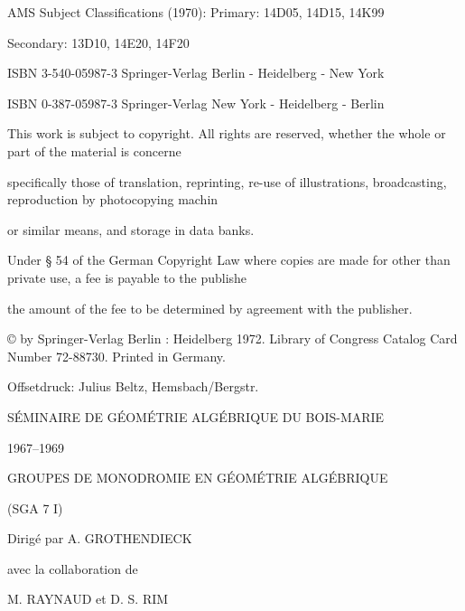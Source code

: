 \noindent
AMS Subject Classifications (1970): Primary: 14D05, 14D15, 14K99\par
\hspace*{8em}Secondary: 13D10, 14E20, 14F20\par

\medskip
\noindent
ISBN 3-540-05987-3 Springer-Verlag Berlin - Heidelberg - New York\par
ISBN 0-387-05987-3 Springer-Verlag New York - Heidelberg - Berlin\par

\medskip
\noindent
This work is subject to copyright. All rights are reserved, whether the whole or part of the material is concerne\par
specifically those of translation, reprinting, re-use of illustrations, broadcasting, reproduction by photocopying machin\par
or similar means, and storage in data banks.\par
Under § 54 of the German Copyright Law where copies are made for other than private use, a fee is payable to the publishe\par
the amount of the fee to be determined by agreement with the publisher.\par

\medskip
\noindent
© by Springer-Verlag Berlin : Heidelberg 1972. Library of Congress Catalog Card Number 72-88730. Printed in Germany.\par

\medskip
\noindent
Offsetdruck: Julius Beltz, Hemsbach/Bergstr.\par
\clearpage

\begin{center}
SÉMINAIRE DE GÉOMÉTRIE ALGÉBRIQUE DU BOIS-MARIE

1967--1969

\bigskip
GROUPES DE MONODROMIE EN GÉOMÉTRIE ALGÉBRIQUE

(SGA 7 I)

\bigskip
Dirigé par A. GROTHENDIECK

avec la collaboration de

M. RAYNAUD et D. S. RIM
\end{center}
\clearpage

